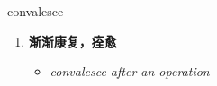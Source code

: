 
\begin{frame}
{\huge convalesce}
\begin{center}
\begin{enumerate}\Large
  \item \textbf{渐渐康复，痊愈}
  \begin{itemize}
    \item \em{\Large{convalesce after an operation}}
  \end{itemize}
\end{enumerate}
\end{center}
\end{frame}
